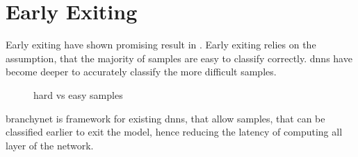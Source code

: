 \chapter{Early Exiting}

Early exiting have shown promising result in \cite{teerapittayanon_branchynet:_2016, teerapittayanon_distributed_2017, huang_multi-scale_2017}. Early exiting relies on the assumption, that the majority of samples are easy to classify correctly. \gls{dnn}s have become deeper to accurately classify the more difficult samples.

\begin{figure}
	hard vs easy samples
\end{figure}

\gls{branchynet} \cite{teerapittayanon_branchynet:_2016} is framework  for existing \gls{dnn}s, that allow samples, that can be classified earlier to exit the model, hence reducing the latency of computing all layer of the network.






% 